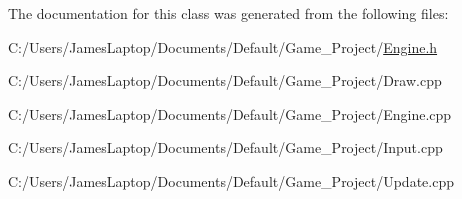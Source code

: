 The documentation for this class was generated from the following files\+:\begin{DoxyCompactItemize}
\item 
C\+:/\+Users/\+James\+Laptop/\+Documents/\+Default/\+Game\+\_\+\+Project/\hyperlink{_engine_8h}{Engine.\+h}\item 
C\+:/\+Users/\+James\+Laptop/\+Documents/\+Default/\+Game\+\_\+\+Project/Draw.\+cpp\item 
C\+:/\+Users/\+James\+Laptop/\+Documents/\+Default/\+Game\+\_\+\+Project/Engine.\+cpp\item 
C\+:/\+Users/\+James\+Laptop/\+Documents/\+Default/\+Game\+\_\+\+Project/Input.\+cpp\item 
C\+:/\+Users/\+James\+Laptop/\+Documents/\+Default/\+Game\+\_\+\+Project/Update.\+cpp\end{DoxyCompactItemize}
